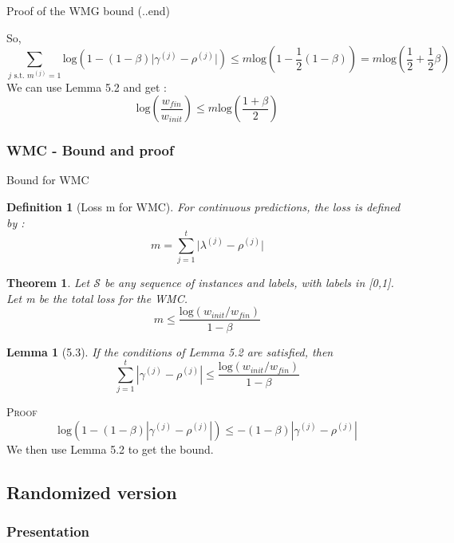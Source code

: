 \documentclass{beamer}
\newtheorem{Lm}{Lemma}
\newtheorem{Th}{Theorem}
\newtheorem{Def}{Definition}
\newcommand{\abs}[1]{\left\lvert#1\right\rvert}
\begin{document}
\begin{frame}{Proof of the WMG bound (..end)}

So, 
\[\sum_{j\text{ s.t. }m^{(j)}=1}\mathrm{log}(1-(1-\beta)\lvert\gamma^{(j)} - \rho^{(j)}\rvert)\leq m\mathrm{log}(1-\frac{1}{2}(1-\beta)) = m\mathrm{log}(\frac{1}{2}+\frac{1}{2}\beta)\]
We can use Lemma 5.2 and get :
\[\mathrm{log}(\frac{w_{fin}}{w_{init}})\leq m\mathrm{log}(\frac{1+\beta}{2})\]

\end{frame}

			\subsubsection*{WMC - Bound and proof}

\begin{frame}{Bound for WMC}

\begin{Def}[Loss m  for WMC]
For continuous predictions, the loss is defined by :
\[m = \sum_{j=1}^{t}\lvert\lambda^{(j)} - \rho^{(j)}\rvert\]
\end{Def}

\begin{Th}
Let $\mathcal{S}$ be any sequence of instances and labels, with labels in [0,1]. Let m be the total  loss for the WMC.
\[m\leq\frac{\mathrm{log}(w_{init}/w_{fin})}{1-\beta}\]
\end{Th}

\end{frame}

\begin{frame}

\begin{Lm}[5.3]
If the conditions of Lemma 5.2 are satisfied, then 
\[\sum_{j=1}^{t}\abs{\gamma^{(j)} - \rho^{(j)}} \leq \frac{\mathrm{log}(w_{init}/w_{fin})}{1 - \beta}\]
\end{Lm}
\textsc{Proof}
\[\mathrm{log}(1 - (1 - \beta)\abs{\gamma^{(j)} - \rho^{(j)}}) \leq - (1 - \beta)\abs{\gamma^{(j)} - \rho^{(j)}}\]
We then use Lemma 5.2 to get the bound.

\end{frame}

		
		\subsection{Randomized version}
			\subsubsection*{Presentation}
\end{document}
